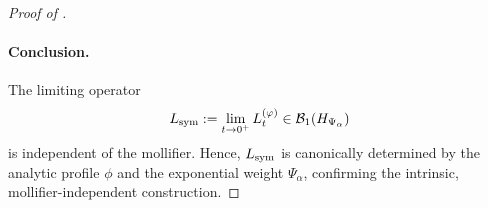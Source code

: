 \begin{proof}[Proof of ]
\paragraph{Conclusion.}  
The limiting operator
\[
L_{\mathrm{sym}} := \lim_{t \to 0^+} L_t^{(\varphi)} \in \mathcal{B}_1(H_{\Psi_\alpha})
\]
is independent of the mollifier. Hence, \( L_{\mathrm{sym}} \) is canonically determined by the analytic profile \( \phi \) and the exponential weight \( \Psi_\alpha \), confirming the intrinsic, mollifier-independent construction.
\end{proof}
